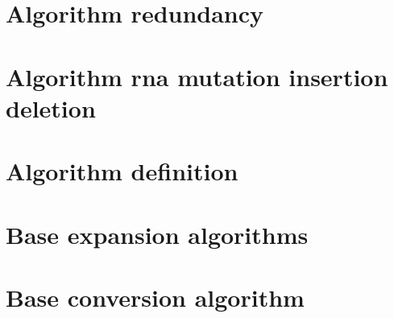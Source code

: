 
\section*{Algorithm redundancy}

\vfill
\section*{Algorithm rna mutation insertion deletion}

\vfill
\section*{Algorithm definition}

\vfill
\section*{Base expansion algorithms}

\vfill
\section*{Base conversion algorithm}

\vfill
